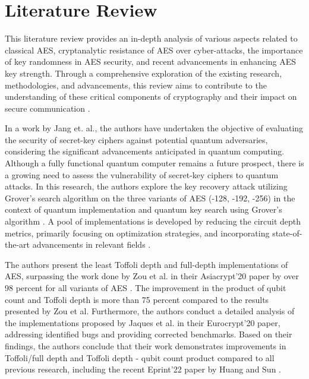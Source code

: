 \section{Literature Review}
\label{sec2}

This literature review provides an in-depth analysis of various aspects related to classical AES, cryptanalytic resistance of AES over cyber-attacks, the importance of key randomness in AES security, and recent advancements in enhancing AES key strength. Through a comprehensive exploration of the existing research, methodologies, and advancements, this review aims to contribute to the understanding of these critical components of cryptography and their impact on secure communication \cite{dong2021automatic}\cite{stefanov2000optical}. 


In a work by Jang et. al., the authors have undertaken the objective of evaluating the security of secret-key ciphers against potential quantum adversaries, considering the significant advancements anticipated in quantum computing. Although a fully functional quantum computer remains a future prospect, there is a growing need to assess the vulnerability of secret-key ciphers to quantum attacks. In this research, the authors explore the key recovery attack utilizing Grover's search algorithm on the three variants of AES (-128, -192, -256) in the context of quantum implementation and quantum key search using Grover's algorithm \cite{wang2022quantumsafe}. A pool of implementations is developed by reducing the circuit depth metrics, primarily focusing on optimization strategies, and incorporating state-of-the-art advancements in relevant fields \cite{ma2016quantum}\cite{rarity1994quantum}. 


The authors present the least Toffoli depth and full-depth implementations of AES, surpassing the work done by Zou et al. in their Asiacrypt'20 paper by over 98 percent for all variants of AES \cite{zou2020quantum}. The improvement in the product of qubit count and Toffoli depth is more than 75 percent compared to the results presented by Zou et al. Furthermore, the authors conduct a detailed analysis of the implementations proposed by Jaques et al. in their Eurocrypt'20 paper, addressing identified bugs and providing corrected benchmarks. Based on their findings, the authors conclude that their work demonstrates improvements in Toffoli/full depth and Toffoli depth - qubit count product compared to all previous research, including the recent Eprint'22 paper by Huang and Sun \cite{huang2022synthesizing}\cite{wang2022quantumcircuit}. 


